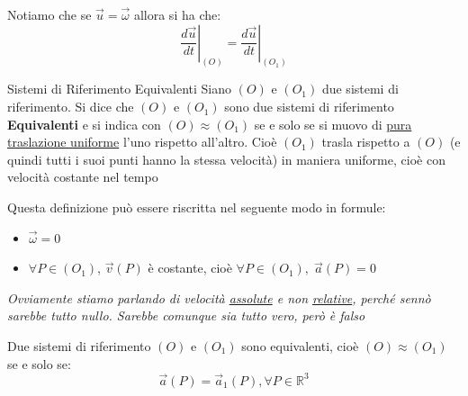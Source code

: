 \documentclass[11pt,a4paper,twoside]{article}
\theoremstyle{definition}
\begin{document}
Notiamo che se $\vec u = \vec \omega$ allora si ha che:
\[ \left.\frac{d\vec u}{dt}\right|_{(O)} = \left.\frac{d\vec u}{dt}\right|_{(O_1)} \]

\begin{defn}{Sistemi di Riferimento Equivalenti}{}
	Siano $(O)$ e $(O_1)$ due sistemi di riferimento. Si dice che $(O)$ e $(O_1)$ sono due sistemi di riferimento \textbf{Equivalenti} e si indica con $(O)\approx (O_1)$ se e solo se si muovo di \underline{pura traslazione uniforme} l'uno rispetto all'altro.
	Cioè $(O_1)$ trasla rispetto a $(O)$ (e quindi tutti i suoi punti hanno la stessa velocità) in maniera uniforme, cioè con velocità costante nel tempo
\end{defn}

Questa definizione può essere riscritta nel seguente modo in formule:
\begin{itemize}
	\item $\vec \omega = 0$
	\item $\forall P \in (O_1)$, $\vec v(P)$ è costante, cioè $\forall P \in (O_1), \;\vec a(P)=0$
\end{itemize}
\textit{Ovviamente stiamo parlando di velocità \underline{assolute} e non \underline{relative}, perché sennò sarebbe tutto nullo. Sarebbe comunque sia tutto vero, però è falso}

\begin{prop}{}{}
	Due sistemi di riferimento $(O)$ e $(O_1)$ sono equivalenti, cioè $(O)\approx(O_1)$ se e solo se:
	\[ \vec a(P) = \vec a_1(P), \forall P \in \mathbb R^3 \]
\end{prop}
\end{document}
